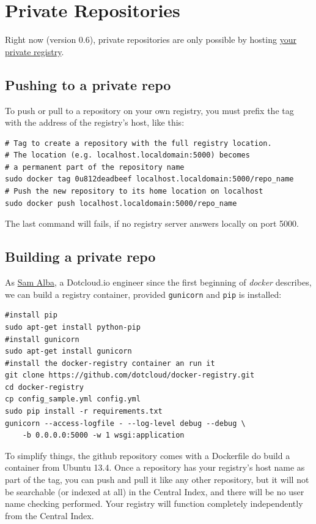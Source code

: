 \documentclass[11pt]{article}
\begin{document}
\section{Private Repositories}
\label{sec-3}

Right now (version 0.6), private repositories are only possible by hosting \href{https://github.com/dotcloud/docker-registry}{your private registry}. 
\subsection{Pushing to a private repo}
\label{sec-3-1}

To push or pull to a repository on your own registry, you must prefix the tag with the address of the registry’s host, like this:

\begin{verbatim}
# Tag to create a repository with the full registry location.
# The location (e.g. localhost.localdomain:5000) becomes
# a permanent part of the repository name
sudo docker tag 0u812deadbeef localhost.localdomain:5000/repo_name
# Push the new repository to its home location on localhost
sudo docker push localhost.localdomain:5000/repo_name
\end{verbatim}
The last command will fails, if no registry server answers locally on port 5000.
\subsection{Building a private repo}
\label{sec-3-2}

As \href{http://blog.docker.io/2013/07/how-to-use-your-own-registry/}{Sam Alba}, a Dotcloud.io engineer since the first beginning of \emph{docker} describes, we can build a registry container, provided \texttt{gunicorn} and \texttt{pip} is installed:

\begin{verbatim}
#install pip 
sudo apt-get install python-pip
#install gunicorn
sudo apt-get install gunicorn
#install the docker-registry container an run it
git clone https://github.com/dotcloud/docker-registry.git
cd docker-registry
cp config_sample.yml config.yml
sudo pip install -r requirements.txt
gunicorn --access-logfile - --log-level debug --debug \
    -b 0.0.0.0:5000 -w 1 wsgi:application
\end{verbatim}

To simplify things, the github repository comes with a Dockerfile do build a container from Ubuntu 13.4.
Once a repository has your registry’s host name as part of the tag, you can push and pull it like any other repository, but it will not be searchable (or indexed at all) in the Central Index, and there will be no user name checking performed. Your registry will function completely independently from the Central Index.
\end{document}
